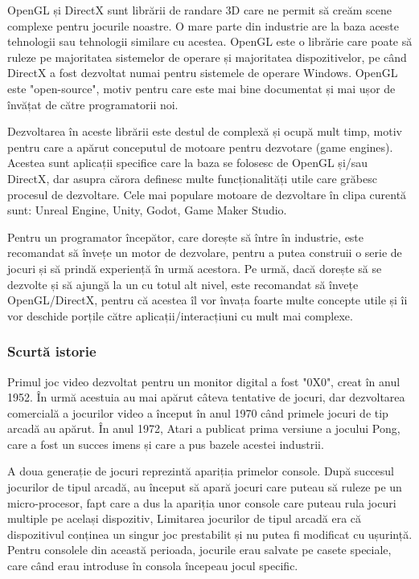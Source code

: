 \documentclass[12pt, a4paper]{article}
\begin{document}
	OpenGL și DirectX sunt librării de randare 3D care ne permit să creăm scene complexe pentru jocurile noastre. O mare parte din industrie are la baza aceste tehnologii sau tehnologii similare cu acestea. OpenGL este o librărie care poate să ruleze pe majoritatea sistemelor de operare și majoritatea dispozitivelor, pe când DirectX a fost dezvoltat numai pentru sistemele de operare Windows. OpenGL este "open-source", motiv pentru care este mai bine documentat și mai ușor de învățat de către programatorii noi.
	\newline
	
	Dezvoltarea în aceste librării este destul de complexă și ocupă mult timp, motiv pentru care a apărut conceputul de motoare pentru dezvotare (game engines). Acestea sunt aplicații specifice care la baza se folosesc de OpenGL și/sau DirectX, dar asupra cărora definesc multe funcționalități utile care grăbesc procesul de dezvoltare. Cele mai populare motoare de dezvoltare în clipa curentă sunt: Unreal Engine, Unity, Godot, Game Maker Studio.
	\newline
	
	Pentru un programator începător, care dorește să între în industrie, este recomandat să învețe un motor de dezvolare, pentru a putea construii o serie de jocuri și să prindă experiență în urmă acestora. Pe urmă, dacă dorește să se dezvolte și să ajungă la un cu totul alt nivel, este recomandat să învețe OpenGL/DirectX, pentru că acestea îl vor învața foarte multe concepte utile și îi vor deschide porțile către aplicații/interacțiuni cu mult mai complexe.
	
	
	
	
	\subsubsection{Scurtă istorie}
	
	Primul joc video dezvoltat pentru un monitor digital a fost "0X0", creat în anul 1952. În urmă acestuia au mai apărut câteva tentative de jocuri, dar dezvoltarea comercială a jocurilor video a început în anul 1970 când primele jocuri de tip arcadă au apărut. În anul 1972, Atari a publicat prima versiune a jocului Pong, care a fost un succes imens și care a pus bazele acestei industrii.
	\newline
	
	A doua generație de jocuri reprezintă apariția primelor console. După succesul jocurilor de tipul arcadă, au început să apară jocuri care puteau să ruleze pe un micro-procesor, fapt care a dus la apariția unor console care puteau rula jocuri multiple pe același dispozitiv, Limitarea jocurilor de tipul arcadă era că dispozitivul conținea un singur joc prestabilit și nu putea fi modificat cu ușurință. Pentru consolele din această perioada, jocurile erau salvate pe casete speciale, care când erau introduse în consola începeau jocul specific.
	\newline
	
\end{document}
